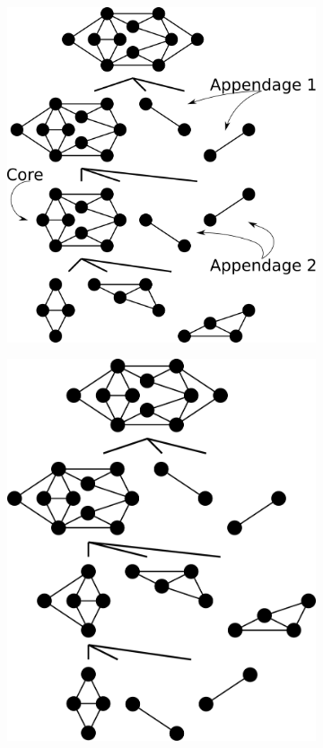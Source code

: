 \begin{figure}\centering
    \begin{subfigure}{0.48\linewidth}\centering
        \includegraphics[height=\myMinHeight]{../../img/svg/pseudoseq_vs_seq_seq}
        \caption{}\label{fig:pseudoseq_vs_seq:seq}
    \end{subfigure}%
    \hfill
    \begin{subfigure}{0.48\linewidth}\centering
        \includegraphics[height=\myMinHeight]{../../img/svg/pseudoseq_vs_seq_pseudoseq}

\end{subfigure}
\end{figure}

